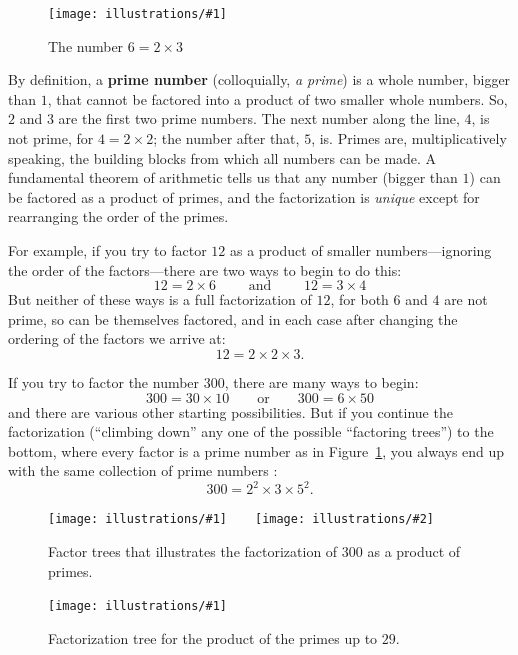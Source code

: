 \documentclass[openany]{book}
\newcommand{\ill}[3]{%
   \begin{figure}[H]%
   \vspace{-2ex}
   \centering%
   \texttt{[image: illustrations/\#1]}%
   \caption{#3}%
   \vspace{-2ex}
    \end{figure}}
\newcommand{\illtwo}[4]{%
   \begin{figure}[H]\centering%
   \texttt{[image: illustrations/\#1]}$\qquad$\texttt{[image: illustrations/\#2]}%
   \caption{#4}%
    \end{figure}}
\theoremstyle{plain}
\theoremstyle{definition}
\begin{document}
\ill{factor_tree_6}{.3}{The number $6 = 2\times 3$}


By definition, a {\bf prime number}
(colloquially, {\em a prime}) is a whole number, bigger than $1$, that
cannot be factored into a product of two smaller whole numbers. So,
$2$ and $3$ are the first two prime numbers. The next number along the
line, $4$, is not prime, for $4= 2\times 2$; the number after that,
$5$, is. Primes are, multiplicatively speaking, the building blocks
from which all numbers can be made. A fundamental theorem of
arithmetic tells us that any number (bigger than $1$) can be factored
as a product of primes, and the factorization is {\em unique} except
for rearranging the order of the primes.



For example, if you try to factor $12$ as a product of
smaller numbers---ignoring the order of the factors---there are two
ways to begin to do this:
$$
  12 = 2 \times 6 \qquad\text{ and }\qquad   12 = 3 \times 4
$$
But neither of these ways is a full factorization of $12$, for both
$6$ and $4$ are not prime, so can be themselves factored, and in each
case after changing the ordering of the factors we arrive at:
$$
   12= 2 \times 2 \times 3.
$$

If you try to factor the number $300$, there are many
ways to begin:
$$
  300= 30\times 10\qquad\text{or}\qquad 300 = 6 \times 50
$$
and there are various other starting possibilities. But if you
continue the factorization (``climbing down'' any one of the possible
``factoring trees'') to the bottom, where every factor is a prime
number as in Figure~\ref{fig:factor300}, you always end up with the
same collection of prime numbers :
                 $$300 = 2^2\times 3\times 5^2.$$

\illtwo{factor_tree_300_a}{factor_tree_300_b}{.47}
{Factor trees that illustrates the factorization of 300 as a product of primes.\label{fig:factor300}}

\ill{factor_tree_big}{1}{Factorization tree for the product of the primes up to $29$.\label{factor.tree.big}}
\end{document}
